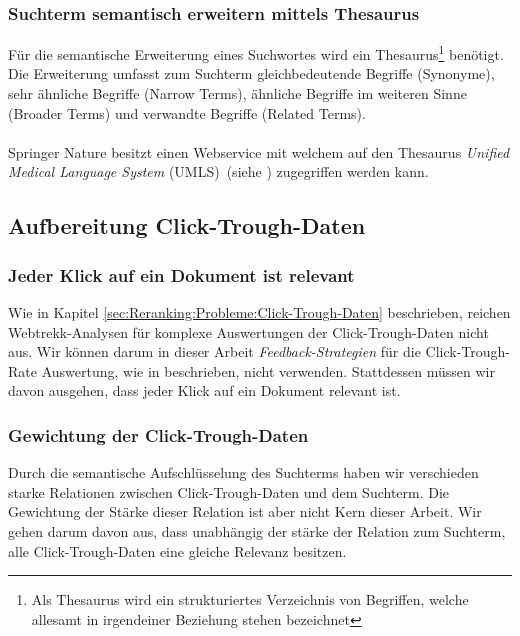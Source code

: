 \subsubsection{Suchterm semantisch erweitern mittels Thesaurus}
\label{sec:Reranking:Methodik:SuchtermSegmentierung:SuchtermThesaurus}

Für die semantische Erweiterung eines Suchwortes wird ein Thesaurus\footnote{Als Thesaurus wird ein strukturiertes Verzeichnis von Begriffen, welche allesamt in irgendeiner Beziehung stehen bezeichnet} benötigt. Die Erweiterung umfasst zum Suchterm gleichbedeutende Begriffe (Synonyme), sehr ähnliche Begriffe (Narrow Terms), ähnliche Begriffe im weiteren Sinne (Broader Terms) und verwandte Begriffe (Related Terms).
\\
\\
Springer Nature besitzt einen Webservice mit welchem auf den Thesaurus \textit{Unified Medical Language System} (UMLS)~(siehe \cite{UMLS}) zugegriffen werden kann. 

\subsection{Aufbereitung Click-Trough-Daten}
\label{sec:Reranking:Methodik:Click-Trough-Daten}

\subsubsection{Jeder Klick auf ein Dokument ist relevant}
\label{sec:Reranking:Methodik:Click-Trough-Daten:Click-Trough-DatenAuswertungen}

Wie in Kapitel \ref{sec:Reranking:Probleme:Click-Trough-Daten} beschrieben, reichen Webtrekk-Analysen für komplexe Auswertungen der Click-Trough-Daten nicht aus. Wir können darum in dieser Arbeit \textit{Feedback-Strategien} für die Click-Trough-Rate Auswertung, wie in \cite{Joachims} beschrieben, nicht verwenden. Stattdessen müssen wir davon ausgehen, dass jeder Klick auf ein Dokument relevant ist.

\subsubsection{Gewichtung der Click-Trough-Daten}
\label{sec:Reranking:Methodik:Click-Trough-Daten:Gewichtung}

Durch die semantische Aufschlüsselung des Suchterms haben wir verschieden starke Relationen zwischen Click-Trough-Daten und dem Suchterm. Die Gewichtung der Stärke dieser Relation ist aber nicht Kern dieser Arbeit. Wir gehen darum davon aus, dass unabhängig der stärke der Relation zum Suchterm, alle Click-Trough-Daten eine gleiche Relevanz besitzen.

